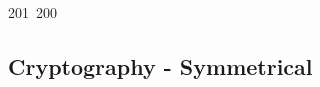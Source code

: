 201~200~\documentclass{article}
\begin{document}
	                                                                                                                                                                                                                                                                                                	                                                                                                                                        	    	                                                                                                	                                                                                                                                                                                                                                                                                                                                	                                                                        	                                                                        	                                                                                                                                        	                                                                                                                                                                                                                        	                                                                                                                            	                                                                	                                                                                        \subsection{Cryptography - Symmetrical}
\end{document}
